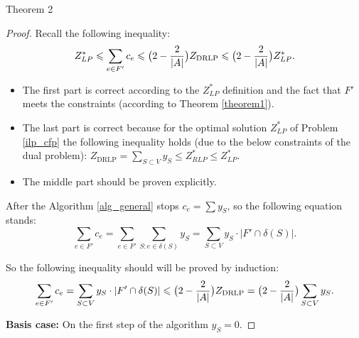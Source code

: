\documentclass[11pt, tightenlines, twoside, onecolumn, nofloats, nobibnotes, nofootinbib, superscriptaddress, noshowpacks, centertags]{revtex4}
\begin{document}
Theorem 2 \begin{proof}
    Recall the following inequality:
    $$
    Z_{LP}^{\ast}\leqslant \sum\limits_{e\in F'}c_e \leqslant \big( 2 - \frac{2}{|A|}\big) Z_{\text{DRLP}}\leqslant 
    \big( 2 - \frac{2}{|A|}\big) Z_{LP}^{\ast}.
    $$
    \begin{itemize}
        \item The first part is correct according to the $Z_{LP}^{\ast}$ definition and the fact that $F'$ meets the constraints (according to Theorem \ref{theorem1}).
        \item The last part is correct because for the optimal solution $Z_{LP}^{\ast}$ of Problem \ref{ilp_cfp} the following inequality holds (due to the below constraints of the dual problem): $Z_{\text{DRLP}} =  \sum_{S\subset V}y_S \leqslant Z_{RLP}^{\ast}\leqslant Z_{LP}^{\ast}$.
        \item The middle part should be proven explicitly.
    \end{itemize}
    
    After the Algorithm \ref{alg_general} stops $c_e = \sum y_S$, so the following equation stands:
    $$\sum\limits_{e\in F'}c_e = \sum\limits_{e\in F'}\sum\limits_{S:e\in \delta(S)}y_S = \sum\limits_{S\subset V}y_S\cdot |F'\cap \delta(S)|.$$
    
    So the following inequality should will be proved by induction:
    $$\sum\limits_{e\in F'}c_e = \sum\limits_{S\subset V}y_S\cdot |F'\cap \delta(S)|\leqslant \big( 2 - \frac{2}{|A|}\big) Z_{\text{DRLP}}=\big( 2 - \frac{2}{|A|}\big) \sum\limits_{S\subset V}y_S.$$
    
    \textbf{Basis case:} On the first step of the algorithm $y_S = 0$.
    

\end{proof}
\end{document}
